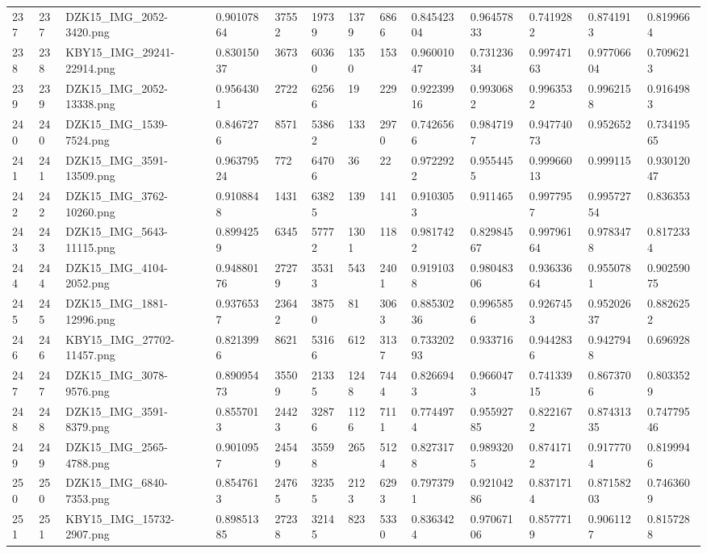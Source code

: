 \documentclass[11pt, a4paper, twoside]{report}
\begin{document}
\begin{longtable}[c]{@{}lllllllllllll@{}}
237 & 237 & DZK15\_IMG\_2052-3420.png & 0.90107864 & 37552 & 19739 & 1379 & 6866 & 0.84542304 & 0.96457833 & 0.7419282 & 0.8741913 & 0.8199664 \\
238 & 238 & KBY15\_IMG\_29241-22914.png & 0.83015037 & 3673 & 60360 & 1350 & 153 & 0.96001047 & 0.73123634 & 0.99747163 & 0.97706604 & 0.7096213 \\
239 & 239 & DZK15\_IMG\_2052-13338.png & 0.9564301 & 2722 & 62566 & 19 & 229 & 0.92239916 & 0.9930682 & 0.9963532 & 0.9962158 & 0.9164983 \\
240 & 240 & DZK15\_IMG\_1539-7524.png & 0.8467276 & 8571 & 53862 & 133 & 2970 & 0.7426566 & 0.9847197 & 0.94774073 & 0.952652 & 0.73419565 \\
241 & 241 & DZK15\_IMG\_3591-13509.png & 0.96379524 & 772 & 64706 & 36 & 22 & 0.9722922 & 0.9554455 & 0.99966013 & 0.999115 & 0.93012047 \\
242 & 242 & DZK15\_IMG\_3762-10260.png & 0.9108848 & 1431 & 63825 & 139 & 141 & 0.9103053 & 0.911465 & 0.9977957 & 0.99572754 & 0.836353 \\
243 & 243 & DZK15\_IMG\_5643-11115.png & 0.8994259 & 6345 & 57772 & 1301 & 118 & 0.9817422 & 0.82984567 & 0.99796164 & 0.9783478 & 0.8172334 \\
244 & 244 & DZK15\_IMG\_4104-2052.png & 0.94880176 & 27279 & 35313 & 543 & 2401 & 0.9191038 & 0.98048306 & 0.93633664 & 0.9550781 & 0.90259075 \\
245 & 245 & DZK15\_IMG\_1881-12996.png & 0.9376537 & 23642 & 38750 & 81 & 3063 & 0.88530236 & 0.9965856 & 0.9267453 & 0.95202637 & 0.8826252 \\
246 & 246 & KBY15\_IMG\_27702-11457.png & 0.8213996 & 8621 & 53166 & 612 & 3137 & 0.73320293 & 0.933716 & 0.9442836 & 0.9427948 & 0.696928 \\
247 & 247 & DZK15\_IMG\_3078-9576.png & 0.89095473 & 35509 & 21335 & 1248 & 7444 & 0.8266943 & 0.9660473 & 0.74133915 & 0.8673706 & 0.8033529 \\
248 & 248 & DZK15\_IMG\_3591-8379.png & 0.8557013 & 24423 & 32876 & 1126 & 7111 & 0.7744974 & 0.95592785 & 0.8221672 & 0.87431335 & 0.74779546 \\
249 & 249 & DZK15\_IMG\_2565-4788.png & 0.9010957 & 24549 & 35598 & 265 & 5124 & 0.8273178 & 0.9893205 & 0.8741712 & 0.9177704 & 0.8199946 \\
250 & 250 & DZK15\_IMG\_6840-7353.png & 0.8547613 & 24765 & 32355 & 2123 & 6293 & 0.7973791 & 0.92104286 & 0.8371714 & 0.87158203 & 0.7463609 \\
251 & 251 & KBY15\_IMG\_15732-2907.png & 0.89851385 & 27238 & 32145 & 823 & 5330 & 0.8363424 & 0.97067106 & 0.8577719 & 0.9061127 & 0.8157288 \\

\end{longtable}
\end{document}
